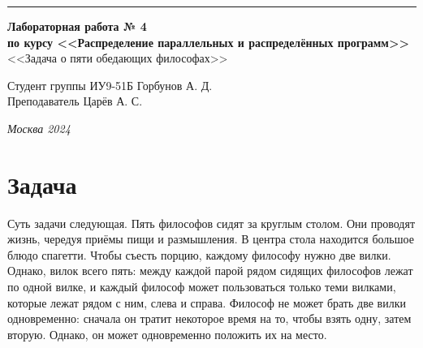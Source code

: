 \documentclass[a4paper, 14pt]{extarticle}
\begin{document}
\begin{titlepage}
\vspace*{-16pt}
\hspace{30pt}\rule{0.866\textwidth}{0.4pt}
  
\vspace{11em}

\begin{center}
\Large {\bf Лабораторная работа № 4} \\ 
\large {\bf по курсу <<Распределение параллельных и распределённых программ>>}\\
\large <<Задача о пяти обедающих философах>>
\end{center}\normalsize

\vspace{8em}


\begin{flushright}
  {Студент группы ИУ9-51Б Горбунов А. Д.\hspace*{15pt} \\
  \vspace{2ex}
  Преподаватель Царёв А. С.\hspace*{15pt}}
\end{flushright}

\bigskip

\vfill
 

\begin{center}
\textsl{Москва 2024}
\end{center}
\end{titlepage}

\renewcommand{\ttdefault}{pcr}

\setlength{\tabcolsep}{3pt}
\newpage
\setcounter{page}{2}

\section{Задача}\label{Sect::task}
\par
    Суть задачи следующая. Пять философов сидят за круглым столом. Они проводят жизнь, чередуя приёмы пищи и размышления. В центра стола находится большое блюдо спагетти. Чтобы съесть порцию, каждому философу нужно две вилки. Однако, вилок всего пять: между каждой парой рядом сидящих философов лежат по одной вилке, и каждый философ может пользоваться только теми вилками, которые лежат рядом с ним, слева и справа. Философ не может брать две вилки одновременно: сначала он тратит некоторое время на то, чтобы взять одну, затем вторую. Однако, он может одновременно положить их на место.
\end{document}
